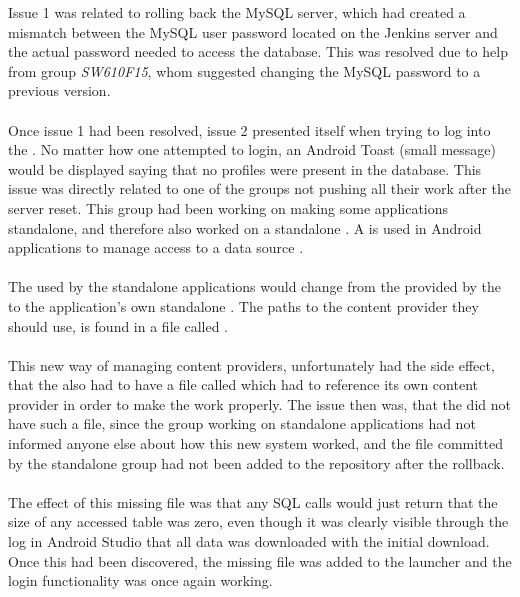 Issue 1 was related to rolling back the MySQL server, which had created a mismatch between the MySQL user password located on the Jenkins server and the actual password needed to access the database. This was resolved due to help from group \emph{SW610F15}, whom suggested changing the MySQL password to a previous version.
\\\\
Once issue 1 had been resolved, issue 2 presented itself when trying to log into the \giraf \launcher. No matter how one attempted to login, an Android Toast (small message) would be displayed saying that no profiles were present in the database. This issue was directly related to one of the groups not pushing all their work after the server reset. This group had been working on making some applications standalone, and therefore also worked on a standalone . A  is used in Android applications to manage access to a data source \parencite{android_content_provider}. 
\\\\
The  used by the standalone applications would change from the  provided by the \launcher to the application's own standalone . The paths to the content provider they should use, is found in a file called .
\\\\
This new way of managing content providers, unfortunately had the side effect, that the \launcher also had to have a file called  which had to reference its own content provider in order to make the \launcher work properly. The issue then was, that the \launcher did not have such a file, since the group working on standalone applications had not informed anyone else about how this new system worked, and the file committed by the standalone group had not been added to the \launcher repository after the rollback. 
\\\\
The effect of this missing file was that any SQL calls would just return that the size of any accessed table was zero, even though it was clearly visible through the log in Android Studio that all data was downloaded with the initial download. Once this had been discovered, the missing  file was added to the launcher and the login functionality was once again working.
